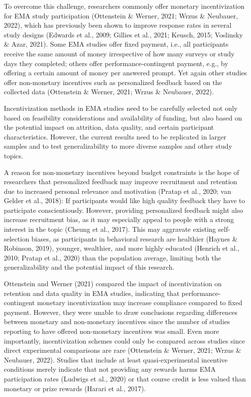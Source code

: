 \documentclass[authordate, empirical]{jote-new-article}
\begin{document}
	To overcome this challenge, researchers commonly offer monetary incentivization for EMA study participation (Ottenstein \& Werner, 2021; Wrzus \& Neubauer, 2022), which has previously been shown to improve response rates in several study designs (Edwards et al., 2009; Gillies et al., 2021; Keusch, 2015; Voslinsky \& Azar, 2021). Some EMA studies offer fixed payment, i.e., all participants receive the same amount of money irrespective of how many surveys or study days they completed; others offer performance-contingent payment, e.g., by offering a certain amount of money per answered prompt. Yet again other studies offer non-monetary incentives such as personalized feedback based on the collected data (Ottenstein \& Werner, 2021; Wrzus \& Neubauer, 2022).


	\begin{takeHomeMessage}
		Incentivization methods in EMA studies need to be carefully selected not only based on feasibility considerations and availability of funding, but also based on the potential impact on attrition, data quality, and certain participant characteristics. However, the current results need to be replicated in larger samples and to test generalizability to more diverse samples and other study topics.
	
	\end{takeHomeMessage}

	A reason for non-monetary incentives beyond budget constraints is the hope of researchers that personalized feedback may improve recruitment and retention due to increased personal relevance and motivation (Pratap et al., 2020; van Gelder et al., 2018): If participants would like high quality feedback they have to participate conscientiously. However, providing personalized feedback might also increase recruitment bias, as it may especially appeal to people with a strong interest in the topic (Cheung et al., 2017). This may aggravate existing self-selection biases, as participants in behavioral research are healthier (Haynes \& Robinson, 2019), younger, wealthier, and more highly educated (Henrich et al., 2010; Pratap et al., 2020) than the population average, limiting both the generalizability and the potential impact of this research.



	Ottenstein and Werner (2021) compared the impact of incentivization on retention and data quality in EMA studies, indicating that performance-contingent monetary incentivization may increase compliance compared to fixed payment. However, they were unable to draw conclusions regarding differences between monetary and non-monetary incentives since the number of studies reporting to have offered non-monetary incentives was small. Even more importantly, incentivization schemes could only be compared across studies since direct experimental comparisons are rare (Ottenstein \& Werner, 2021; Wrzus \& Neubauer, 2022). Studies that include at least quasi-experimental incentive conditions merely indicate that not providing any rewards harms EMA participation rates (Ludwigs et al., 2020) or that course credit is less valued than monetary or prize rewards (Harari et al., 2017).
\end{document}
